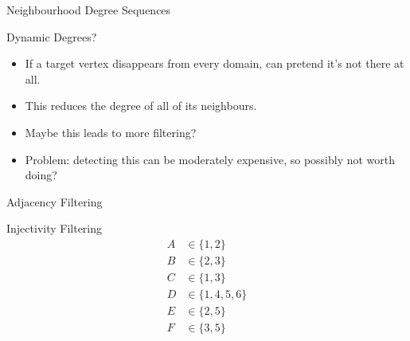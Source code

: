 \documentclass[aspectratio=169,compress,10pt]{beamer}
\begin{document}
\begin{frame}{Neighbourhood Degree Sequences}
\end{frame}

\begin{frame}{Dynamic Degrees?}
    \begin{itemize}
        \item If a target vertex disappears from every domain, can pretend it's not there at all.
        \item This reduces the degree of all of its neighbours.
        \item Maybe this leads to more filtering?
        \item <2-> Problem: detecting this can be moderately expensive, so possibly not worth doing?
    \end{itemize}
\end{frame}

\begin{frame}{Adjacency Filtering}
\end{frame}

\begin{frame}{Injectivity Filtering}
    \begin{align*}
        A &\in \{ 1, 2 \} \\
        B &\in \{ 2, 3 \} \\
        C &\in \{ 1, 3 \} \\
        D &\in \{ 1, 4, 5, 6 \} \\
        E &\in \{ 2, 5 \} \\
        F &\in \{ 3, 5 \}
    \end{align*}
\end{frame}
\end{document}
